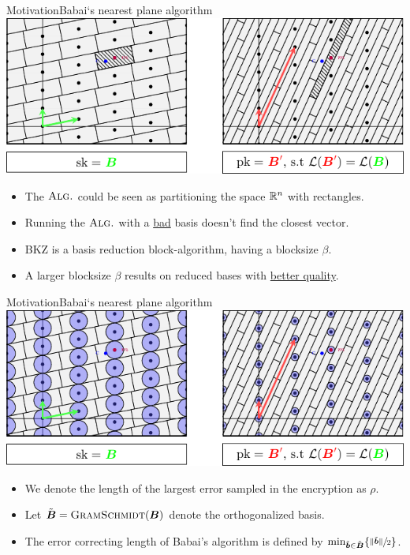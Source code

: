 \documentclass[10pt]{beamer}
\begin{document}
\begin{frame}{Motivation}{Babai`s nearest plane algorithm}
				\includegraphics{figures/ggh-4.pdf}
								\begin{itemize}
												\justifying
												\item The $\textsc{Alg.}$ could be seen as partitioning the space $\mathbb{R}^{n}$ with rectangles.
												\item Running the $\textsc{Alg.}$ with a \underline{bad} basis doesn't find the closest vector.
												\item BKZ is a basis reduction block-algorithm, having a blocksize $\beta$.
												\item A larger blocksize $\beta$ results on reduced bases with \underline{better quality}.
								\end{itemize}
\end{frame}


\begin{frame}{Motivation}{Babai`s nearest plane algorithm}
				\includegraphics{figures/babai-decoding-radius.pdf}

				\begin{itemize}
								\item We denote the length of the largest error sampled in the encryption as $\rho$.
								\item Let $\Tilde{\boldsymbol{B}} = \textsc{GramSchmidt}(\boldsymbol{B})$ denote the orthogonalized basis.
								\item The error correcting length of Babai's algorithm is defined by $\min_{\Tilde{\boldsymbol{b}} \in \Tilde{\boldsymbol{B}}}\{ \sfrac{\| \Tilde{\boldsymbol{b}} \|}{2} \}$.

				\end{itemize}
\end{frame}
\end{document}

